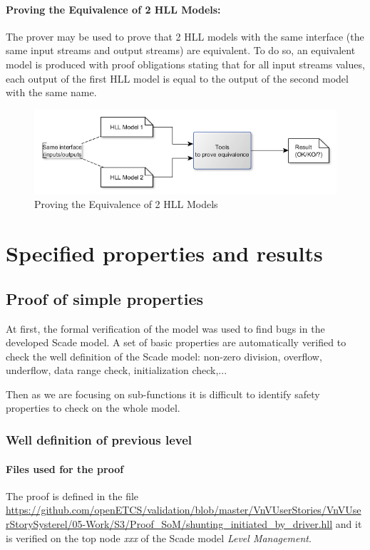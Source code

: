 \documentclass{article}
\begin{document}
\paragraph{ Proving the Equivalence of 2 HLL Models: } The prover may be used to prove that 2 HLL models with the same interface (the same input streams and output streams) are equivalent. To do so, an equivalent model is produced with proof obligations stating that for all input streams values, each output of the first HLL model is equal to the output of the second model with the same name.
\begin{figure}[h!]
\centering
\includegraphics[width=1\textwidth]{Use_equivalence_checker}
\caption{Proving the Equivalence of 2 HLL Models}
\label{fig:eqch}
\end{figure}


\section{Specified properties and results}

\subsection{Proof of simple properties}


At first, the formal verification of the model was used to find bugs in the developed
Scade model.
A set of basic properties are automatically verified to check the well definition
of the Scade model: non-zero division, overflow, underflow, data range check,
initialization check,...

Then as we are focusing on sub-functions it is difficult to identify safety properties
to check on the whole model.

\subsubsection{Well definition of previous level}

\paragraph{Files used for the proof} The proof is defined in the file \url{https://github.com/openETCS/validation/blob/master/VnVUserStories/VnVUserStorySysterel/05-Work/S3/Proof_SoM/shunting_initiated_by_driver.hll} and it is verified on the top node \emph{xxx} of the Scade model \emph{Level Management}.
\end{document}
